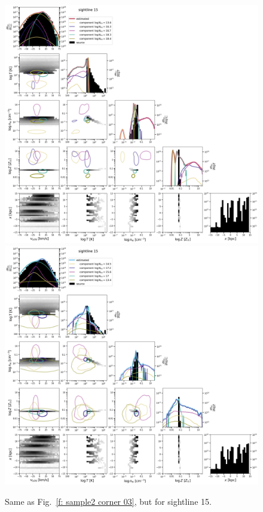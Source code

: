 \documentclass[fleqn,usenatbib]{mnras}
\begin{document}
\begin{figure}
    \centering
    \includegraphics[height=0.45\textheight]{figures/sample2/original/sightline_0015.png}
    \includegraphics[height=0.45\textheight]{figures/sample2/high-z/sightline_0015.png}
    \label{f: sample2 15 corner}
    \caption{Same as Fig.~\ref{f: sample2 corner 03}, but for sightline 15.}
\end{figure}
\end{document}
